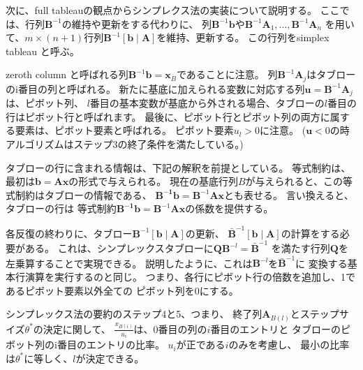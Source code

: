 \documentclass{jsarticle}
\begin{document}
次に、full tableauの観点からシンプレクス法の実装について説明する。
ここでは、行列$\bm{B}^{-1}$の維持や更新をする代わりに、
列$\bm{B}^{-1}\bm{b}$や$\bm{B}^{-1}\bm{A}_1,\dots,\bm{B}^{-1}\bm{A}_n$
を用いて、$m \times(n + 1)$行列$\bm{B}^{-1}[\bm{b}\mid \bm{A}]$を維持、更新する。
この行列をsimplex tableau と呼ぶ。

zeroth column と呼ばれる列$\bm{B}^{-1}\bm{b}=\bm{x}_B$であることに注意。
列$\bm{B}^{-1}\bm{A}_j$はタブローのi番目の列と呼ばれる。
新たに基底に加えられる変数に対応する列$\bm{u}=\bm{B}^{-1}\bm{A}_j$は、ピボット列、
$l$番目の基本変数が基底から外される場合、タブローの$l$番目の行はピボット行と呼ばれます。
最後に、ピボット行とピボット列の両方に属する要素は、ピボット要素と呼ばれる。
ピボット要素$u_l>0$に注意。
($\bm{u}<0$の時アルゴリズムはステップ3の終了条件を満たしている。)

タブローの行に含まれる情報は、下記の解釈を前提としている。
等式制約は、最初は$\bm{b}=\bm{Ax}$の形式で与えられる。
現在の基底行列$B$が与えられると、この等式制約はタブローの情報である、
$\bm{B^{-1}\bm{b}}=\bm{B}^{-1}\bm{Ax}$とも表せる。 
言い換えると、タブローの行は
等式制約$\bm{B^{-1}\bm{b}}=\bm{B}^{-1}\bm{Ax}$の係数を提供する。

各反復の終わりに、タブロー$\bm{B}^{-1}[\bm{b}\mid \bm{A}]$の更新、
$\bar{\bm{B}}^{-1}[\bm{b}\mid \bm{A}]$の計算をする必要がある。
これは、シンプレックスタブローに$\bm{Q}\bm{B}^{-l} = \bar{\bm{B}}^{-1}$
を満たす行列$\bm{Q}$を左乗算することで実現できる。
説明したように、これは$\bm{B}^{-l}$を$\bar{\bm{B}}^{-1}$に
変換する基本行演算を実行するのと同じ。
つまり、各行にピボット行の倍数を追加し、1であるピボット要素以外全ての
ピボット列を0にする。

シンプレックス法の要約のステップ4と5、つまり、
終了列$\bm{A}_{B(l)}$とステップサイズ$\theta ^*$の決定に関して、
$\frac{x_{B(i)}}{u_i}$は、0番目の列の$i$番目のエントリと
タブローのピボット列のi番目のエントリの比率。
$u_i$が正である$i$のみを考慮し、
最小の比率は$\theta ^*$に等しく、$l$が決定できる。
\end{document}
